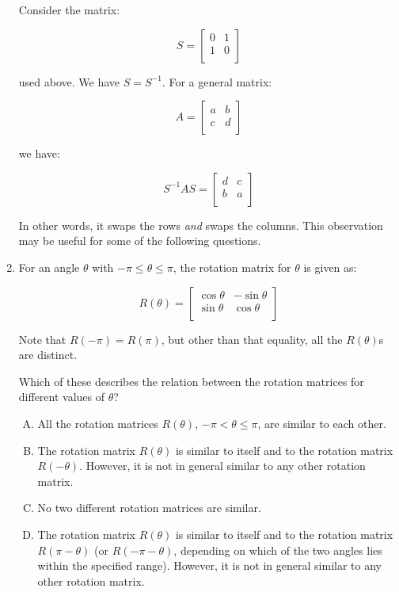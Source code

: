 \documentclass[10pt]{amsart}
\begin{document}
\begin{enumerate}
  Consider the matrix:

  $$S = \left[\begin{matrix} 0 & 1 \\ 1 & 0 \\\end{matrix}\right]$$

  used above. We have $S = S^{-1}$. For a general matrix:

  $$A = \left[\begin{matrix} a & b \\ c & d \\\end{matrix}\right]$$

  we have:

  $$S^{-1}AS = \left[\begin{matrix} d & c \\ b & a \\\end{matrix}\right]$$

  In other words, it swaps the rows {\em and} swaps the columns. This
  observation may be useful for some of the following questions.

\item For an angle $\theta$ with $-\pi \le \theta \le \pi$, the rotation
  matrix for $\theta$ is given as:

  $$R(\theta) = \left[\begin{matrix} \cos \theta & -\sin \theta \\ \sin \theta & \cos \theta \\\end{matrix}\right]$$

  Note that $R(-\pi) = R(\pi)$, but other than that equality, all the
  $R(\theta)$s are distinct.

  Which of these describes the relation between the rotation matrices
  for different values of $\theta$?

  \begin{enumerate}[(A)]
  \item All the rotation matrices $R(\theta)$, $-\pi < \theta \le
    \pi$, are similar to each other.
  \item The rotation matrix $R(\theta)$ is similar to itself and to
    the rotation matrix $R(-\theta)$. However, it is not in general
    similar to any other rotation matrix.
  \item No two different rotation matrices are similar.
  \item The rotation matrix $R(\theta)$ is similar to itself and to
    the rotation matrix $R(\pi -\theta)$ (or $R(-\pi - \theta)$,
    depending on which of the two angles lies within the specified
    range). However, it is not in general similar to any other
    rotation matrix.
  \end{enumerate}


\end{enumerate}
\end{document}
